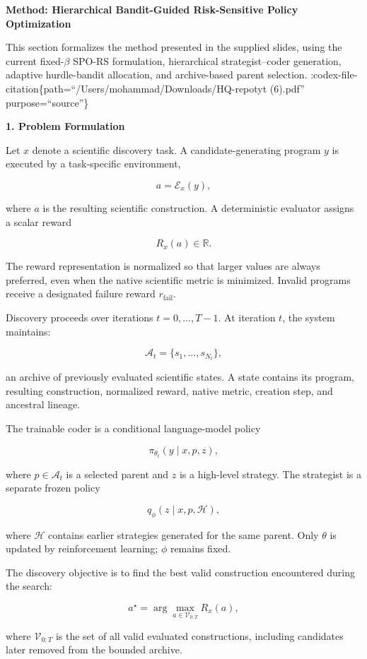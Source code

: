 \documentclass[
]{article}
\author{}
\date{}
\begin{document}
\textbf{Method: Hierarchical Bandit-Guided Risk-Sensitive Policy
Optimization}

This section formalizes the method presented in the supplied slides,
using the current fixed-\(\beta\) SPO-RS formulation, hierarchical
strategist--coder generation, adaptive hurdle-bandit allocation, and
archive-based parent selection.
:codex-file-citation\{path=``/Users/mohammad/Downloads/HQ-repotyt
(6).pdf'' purpose=``source''\}

\textbf{1. Problem Formulation}

Let \(x\) denote a scientific discovery task. A candidate-generating
program \(y\) is executed by a task-specific environment,

\[
a = \mathcal{E}_x(y),
\]

where \(a\) is the resulting scientific construction. A deterministic
evaluator assigns a scalar reward

\[
R_x(a)\in \mathbb{R}.
\]

The reward representation is normalized so that larger values are always
preferred, even when the native scientific metric is minimized. Invalid
programs receive a designated failure reward \(r_{\mathrm{fail}}\).

Discovery proceeds over iterations \(t=0,\ldots,T-1\). At iteration
\(t\), the system maintains:

\[
\mathcal{A}_t=\{s_1,\ldots,s_{N_t}\},
\]

an archive of previously evaluated scientific states. A state contains
its program, resulting construction, normalized reward, native metric,
creation step, and ancestral lineage.

The trainable coder is a conditional language-model policy

\[
\pi_{\theta_t}(y\mid x,p,z),
\]

where \(p\in\mathcal{A}_t\) is a selected parent and \(z\) is a
high-level strategy. The strategist is a separate frozen policy

\[
q_\phi(z\mid x,p,\mathcal{H}),
\]

where \(\mathcal{H}\) contains earlier strategies generated for the same
parent. Only \(\theta\) is updated by reinforcement learning; \(\phi\)
remains fixed.

The discovery objective is to find the best valid construction
encountered during the search:

\[
a^\star
=
\arg\max_{a\in\mathcal{V}_{0:T}} R_x(a),
\]

where \(\mathcal{V}_{0:T}\) is the set of all valid evaluated
constructions, including candidates later removed from the bounded
archive.
\end{document}
